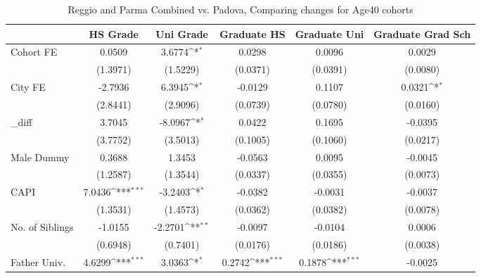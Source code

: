 \begin{table}[htbp]\centering
\def\sym#1{\ifmmode^{#1}\else\(^{#1}\)\fi}
\caption{Reggio and Parma Combined vs. Padova, Comparing changes for Age40 cohorts}
\begin{tabular}{l*{5}{c}}
\toprule
            &\multicolumn{1}{c}{HS Grade}&\multicolumn{1}{c}{Uni Grade}&\multicolumn{1}{c}{Graduate HS}&\multicolumn{1}{c}{Graduate Uni}&\multicolumn{1}{c}{Graduate Grad Sch}\\
\midrule
Cohort FE   &      0.0509         &      3.6774\sym{*}  &      0.0298         &      0.0096         &      0.0029         \\
            &    (1.3971)         &    (1.5229)         &    (0.0371)         &    (0.0391)         &    (0.0080)         \\
\addlinespace
City FE     &     -2.7936         &      6.3945\sym{*}  &     -0.0129         &      0.1107         &      0.0321\sym{*}  \\
            &    (2.8441)         &    (2.9096)         &    (0.0739)         &    (0.0780)         &    (0.0160)         \\
\addlinespace
\_diff       &      3.7045         &     -8.0967\sym{*}  &      0.0422         &      0.1695         &     -0.0395         \\
            &    (3.7752)         &    (3.5013)         &    (0.1005)         &    (0.1060)         &    (0.0217)         \\
\addlinespace
Male Dummy  &      0.3688         &      1.3453         &     -0.0563         &      0.0095         &     -0.0045         \\
            &    (1.2587)         &    (1.3544)         &    (0.0337)         &    (0.0355)         &    (0.0073)         \\
\addlinespace
CAPI        &      7.0436\sym{***}&     -3.2403\sym{*}  &     -0.0382         &     -0.0031         &     -0.0037         \\
            &    (1.3531)         &    (1.4573)         &    (0.0362)         &    (0.0382)         &    (0.0078)         \\
\addlinespace
No. of Siblings&     -1.0155         &     -2.2701\sym{**} &     -0.0097         &     -0.0104         &      0.0006         \\
            &    (0.6948)         &    (0.7401)         &    (0.0176)         &    (0.0186)         &    (0.0038)         \\
\addlinespace
Father Univ.&      4.6299\sym{***}&      3.0363\sym{*}  &      0.2742\sym{***}&      0.1878\sym{***}&     -0.0025         \\

\end{tabular}
\end{table}
